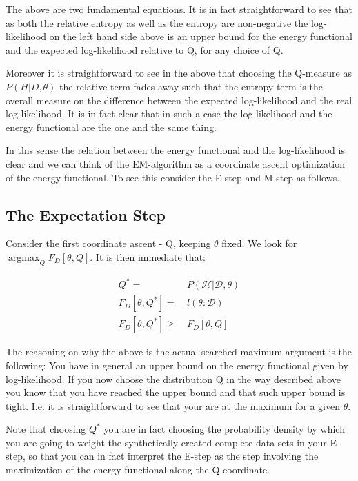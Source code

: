 \documentclass[11pt]{article}
\begin{document}
\begin{article}
The above are two fundamental equations. It is in fact
straightforward to see that as both the relative entropy as well as
the entropy are non-negative the log-likelihood on the left hand
side above is an upper bound for the energy functional and the expected
log-likelihood relative to Q, for any choice of Q.

Moreover it is straightforward to see in the above that choosing the
Q-measure as \(P (H| D, \theta)\) the relative term
fades away such that the entropy term is the overall measure on the
difference between the expected log-likelihood and the real
log-likelihood. It is in fact clear that in such a case the
log-likelihood and the energy functional are the one and the same
thing.

In this sense the relation between the energy functional and the
log-likelihood is clear and we can think of the EM-algorithm as a
coordinate ascent optimization of the energy functional. To see this
consider the E-step and M-step as follows.

\subsection{The Expectation Step}
\label{sec:org47afa43}

Consider the first coordinate ascent - Q, keeping \(\theta\)
fixed. We look for \(\operatorname*{argmax}_{Q} F_D[\theta, Q]\). It
is then immediate that:

\begin{align} \label{eq:q_optimum}
Q^* =& \ P (\mathscr{H}|\mathscr{D}, \theta) \\
F_D[\theta, Q^*] =& \ l (\theta: \mathscr{D}) \\
F_D[\theta, Q^*] \geq& \ F_D[\theta, Q]
\end{align}

The reasoning on why the above is the actual searched maximum
argument is the following: You have in general an upper bound on the
energy functional given by log-likelihood. If you now choose the
distribution Q in the way described above you know that you have
reached the upper bound and that such upper bound is tight. I.e. it
is straightforward to see that your are at the maximum for a given
\(\theta\).

Note that choosing \(Q^*\) you are in fact choosing the probability
density by which you are going to weight the synthetically created
complete data sets in your E-step, so that you can in fact
interpret the E-step as the step involving the maximization of the
energy functional along the Q coordinate.


\end{article}
\end{document}

